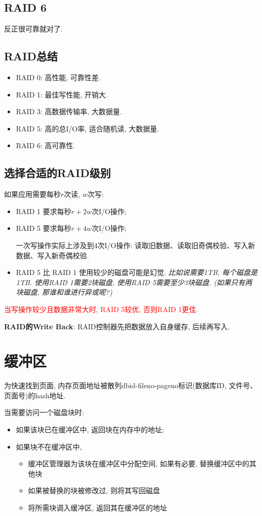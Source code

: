 \subsection{RAID 6}

反正很可靠就对了.

\subsection{RAID总结}

\begin{itemize}
    \item RAID 0: 高性能, 可靠性差.
    \item RAID 1: 最佳写性能, 开销大.
    \item RAID 3: 高数据传输率, 大数据量.
    \item RAID 5: 高的总I/O率, 适合随机读, 大数据量.
    \item RAID 6: 高可靠性.
\end{itemize}

\subsection{选择合适的RAID级别}

如果应用需要每秒$r$次读, $w$次写:
\begin{itemize}
    \item RAID 1 要求每秒$r+2w$次I/O操作;
    \item RAID 5 要求每秒$r+4w$次I/O操作; 
    
    一次写操作实际上涉及到4次I/O操作: 读取旧数据、读取旧奇偶校验、写入新数据、写入新奇偶校验.
    \item RAID 5 比 RAID 1 使用较少的磁盘可能是幻觉. \textit{比如说需要1TB, 每个磁盘是1TB. 使用RAID 1需要2块磁盘, 使用RAID 5需要至少3块磁盘. (如果只有两块磁盘, 那谁和谁进行异或呢?)}
\end{itemize}

\textcolor{red}{当写操作较少且数据非常大时, RAID 5较优, 否则RAID 1更佳.}

\textbf{RAID的Write Back}: RAID控制器先把数据放入自身缓存, 后续再写入.

\section{缓冲区}

为快速找到页面, 内存页面地址被散列dbid-fileno-pageno标识(数据库ID, 文件号、页面号)的hash地址.

当需要访问一个磁盘块时:
\begin{itemize}
    \item 如果该块已在缓冲区中, 返回块在内存中的地址;
    \item 如果块不在缓冲区中,
    \begin{itemize}
        \item 缓冲区管理器为该块在缓冲区中分配空间, 如果有必要, 替换缓冲区中的其他块
        \item 如果被替换的块被修改过, 则将其写回磁盘
        \item 将所需块调入缓冲区, 返回其在缓冲区的地址
    \end{itemize}
\end{itemize}

